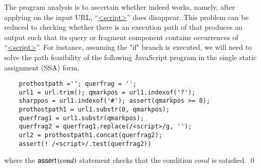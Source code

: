 \begin{example}
The program analysis is to ascertain whether {\urlxsssanitise} indeed works, namely, after applying {\urlxsssanitise} on the input URL, ``\url{<script>}'' does disappear.  This problem can be reduced to checking whether there is an execution path of {\urlxsssanitise} that produces an output such that its query or fragment component contains occurrences of ``\url{<script>}''. For instance, assuming  the "if" branch is executed, %
we will need to solve the path feasibility of the following JavaScript program in the single static assignment (SSA) form,

{\small
\begin{verbatim}
    prothostpath =''; querfrag = '';
    url1 = url.trim(); qmarkpos = url1.indexof('?');
    sharppos = url1.indexof('#'); assert(qmarkpos >= 0); 
    prothostpath1 = url1.substr(0, qmarkpos);
    querfrag1 = url1.substr(qmarkpos);
    querfrag2 = querfrag1.replace(/<script>/g, '');
    url2 = prothostpath1.concat(querfrag2);
    assert(! /<script>/.test(querfrag2))
\end{verbatim}
}
where the $\textsf{assert}\left(cond\right)$ statement checks that the condition $cond$ is satisfied. \qed
\end{example}